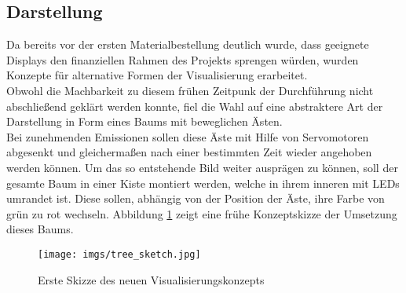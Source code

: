 \documentclass[.../Dokumentation.tex]{subfiles}
\begin{document}
\subsection{Darstellung}\label{sec-ita1-visualization}
Da bereits vor der ersten Materialbestellung deutlich wurde, 
dass geeignete Displays den finanziellen Rahmen des Projekts sprengen 
würden, wurden Konzepte für alternative Formen der Visualisierung erarbeitet.\\
Obwohl die Machbarkeit zu diesem frühen Zeitpunk der Durchführung nicht 
abschließend geklärt werden konnte, fiel die Wahl auf eine abstraktere Art 
der Darstellung in Form eines Baums mit beweglichen Ästen.\\
Bei zunehmenden Emissionen sollen diese Äste mit Hilfe von 
Servomotoren abgesenkt und gleichermaßen nach einer bestimmten Zeit wieder 
angehoben werden können. Um das so entstehende Bild weiter ausprägen zu können, 
soll der gesamte Baum in einer Kiste montiert werden, welche in ihrem inneren 
mit LEDs umrandet ist. Diese sollen, abhängig von der Position der Äste, 
ihre Farbe von grün zu rot wechseln.
Abbildung \ref{fig-tree-sketch} zeigt eine frühe Konzeptskizze der Umsetzung 
dieses Baums.
\begin{figure}[H]
    \begin{center}
    \texttt{[image: imgs/tree\_sketch.jpg]}
    \caption{Erste Skizze des neuen Visualisierungskonzepts}
    \label{fig-tree-sketch}
    \end{center}
\end{figure}
\end{document}
